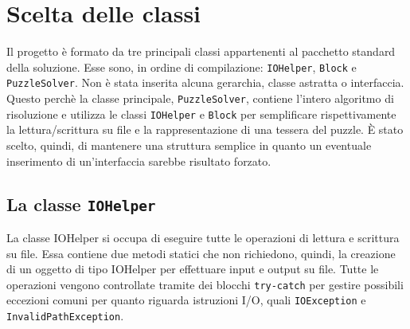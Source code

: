 %
%
%

\section{Scelta delle classi}
Il progetto è formato da tre principali classi appartenenti al pacchetto standard della soluzione. Esse sono, in ordine di compilazione: \texttt{IOHelper}, \texttt{Block} e \texttt{PuzzleSolver}.
Non è stata inserita alcuna gerarchia, classe astratta o interfaccia. Questo perchè la classe principale, \texttt{PuzzleSolver}, contiene l'intero algoritmo di risoluzione e utilizza le classi \texttt{IOHelper} e \texttt{Block} per semplificare rispettivamente la lettura/scrittura su file e la rappresentazione di una tessera del puzzle. \`{E} stato scelto, quindi, di mantenere una struttura semplice in quanto un eventuale inserimento di un'interfaccia sarebbe risultato forzato.

\subsection{La classe \texttt{IOHelper}}
La classe IOHelper si occupa di eseguire tutte le operazioni di lettura e scrittura su file. Essa contiene due metodi statici che non richiedono, quindi, la creazione di un oggetto di tipo IOHelper per effettuare input e output su file. Tutte le operazioni vengono controllate tramite dei blocchi \texttt{try-catch} per gestire possibili eccezioni comuni per quanto riguarda istruzioni I/O, quali \texttt{IOException} e \texttt{InvalidPathException}.

